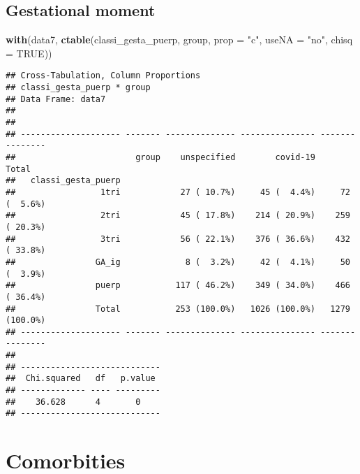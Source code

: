 \documentclass[
]{article}
\newenvironment{Shaded}{\begin{snugshade}}{\end{snugshade}}
\newcommand{\DataTypeTok}[1]{\textcolor[rgb]{0.13,0.29,0.53}{#1}}
\newcommand{\KeywordTok}[1]{\textcolor[rgb]{0.13,0.29,0.53}{\textbf{#1}}}
\newcommand{\NormalTok}[1]{#1}
\newcommand{\OtherTok}[1]{\textcolor[rgb]{0.56,0.35,0.01}{#1}}
\newcommand{\StringTok}[1]{\textcolor[rgb]{0.31,0.60,0.02}{#1}}
\begin{document}
\hypertarget{gestational-moment}{%
\subsection{Gestational moment}\label{gestational-moment}}

\begin{Shaded}
\begin{Highlighting}[]
\KeywordTok{with}\NormalTok{(data7, }\KeywordTok{ctable}\NormalTok{(classi_gesta_puerp, group, }\DataTypeTok{prop =} \StringTok{"c"}\NormalTok{, }\DataTypeTok{useNA =} \StringTok{"no"}\NormalTok{, }\DataTypeTok{chisq =} \OtherTok{TRUE}\NormalTok{))}
\end{Highlighting}
\end{Shaded}

\begin{verbatim}
## Cross-Tabulation, Column Proportions  
## classi_gesta_puerp * group  
## Data Frame: data7  
## 
## 
## -------------------- ------- -------------- --------------- ---------------
##                        group    unspecified        covid-19           Total
##   classi_gesta_puerp                                                       
##                 1tri            27 ( 10.7%)     45 (  4.4%)     72 (  5.6%)
##                 2tri            45 ( 17.8%)    214 ( 20.9%)    259 ( 20.3%)
##                 3tri            56 ( 22.1%)    376 ( 36.6%)    432 ( 33.8%)
##                GA_ig             8 (  3.2%)     42 (  4.1%)     50 (  3.9%)
##                puerp           117 ( 46.2%)    349 ( 34.0%)    466 ( 36.4%)
##                Total           253 (100.0%)   1026 (100.0%)   1279 (100.0%)
## -------------------- ------- -------------- --------------- ---------------
## 
## ----------------------------
##  Chi.squared   df   p.value 
## ------------- ---- ---------
##    36.628      4       0    
## ----------------------------
\end{verbatim}

\hypertarget{comorbities}{%
\section{Comorbities}\label{comorbities}}
\end{document}
